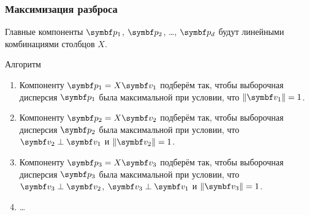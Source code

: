 \begin{frame}
  \frametitle{Максимизация разброса}

  Главные компоненты $\bp_1$, $\bp_2$, \ldots, $\bp_d$ будут линейными 
  комбинациями столбцов $X$. \pause

  \begin{block}{Алгоритм}
    \begin{enumerate}
      \item Компоненту $\bp_1 = X \bv_1$ подберём так, чтобы 
      выборочная дисперсия $\bp_1$ была максимальной при условии, что $\norm{\bv_1}=1$. \pause
    \item Компоненту $\bp_2 = X \bv_2$ подберём так, чтобы 
    выборочная дисперсия $\bp_2$ была максимальной при условии, что $\bv_2 \perp \bv_1$ и $\norm{\bv_2}=1$. \pause
  \item Компоненту $\bp_3 = X \bv_3$ подберём так, чтобы 
  выборочная дисперсия $\bp_3$ была максимальной при условии, что $\bv_3 \perp \bv_2$, $\bv_3 \perp \bv_1$ и $\norm{\bv_3}=1$. 
      \item \ldots
    \end{enumerate}
    
  \end{block}
  

\end{frame}


